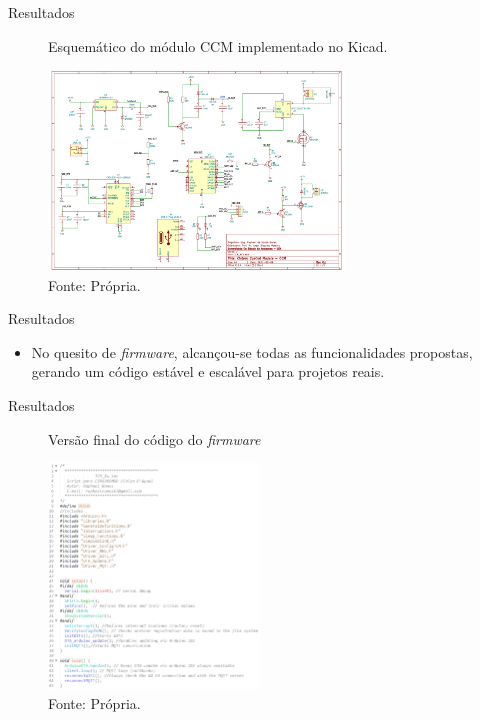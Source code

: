 \begin{frame}{Resultados}

  \begin{figure}[H]
    \centering
    \caption{Esquemático do módulo CCM implementado no Kicad.}
    \includegraphics[width=0.7\textwidth]{figuras/kicad_ccm.png}
    \caption*{\tiny{Fonte: Própria.}}
    \label{fig:kicad_ccm}
  \end{figure}

\end{frame}

\begin{frame}{Resultados}

  \begin{itemize}
    \item No quesito de \textit{firmware}, alcançou-se todas as funcionalidades propostas, gerando um código estável e escalável para projetos reais.
  \end{itemize}

\end{frame}

\begin{frame}{Resultados}
  \begin{figure}[H]
    \centering
    \caption{Versão final do código do \textit{firmware}}
    \includegraphics[width=0.5\textwidth]{figuras/tcm_main.png}
    \caption*{\tiny{Fonte: Própria.}}
    \label{fig:tcm_main}
  \end{figure}
\end{frame}

